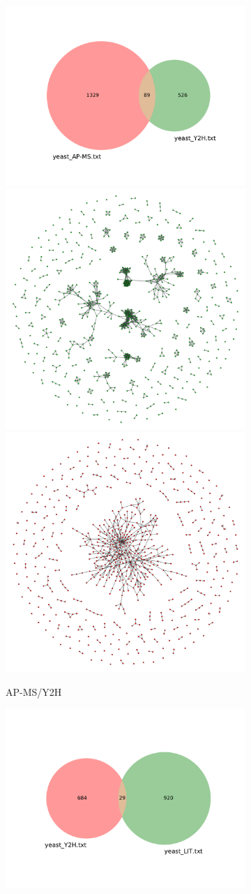 \begin{figure}[!ht]
\begin{subfigure}[b]{0.3\columnwidth}
        \includegraphics[width=.7\textwidth]{./schemes/venn2_coherence_yeast_AP-MS-yeast_Y2H.pdf}\\
        \includegraphics[width=.45\textwidth]{./schemes/subgrafo_APMS_ap_ms_y2h-gml.pdf}
        \includegraphics[width=.45\textwidth]{./schemes/subgrafo_Y2H_ap_ms_y2h-gml.pdf}
        \caption{\label{fig:apms-y2h} AP-MS/Y2H}
    \end{subfigure}
    \begin{subfigure}[b]{0.3\columnwidth}
        \centering
        \includegraphics[width=.7\textwidth]{./schemes/venn2_coherence_yeast_Y2H-yeast_LIT.pdf}\\

\end{subfigure}
\end{figure}
